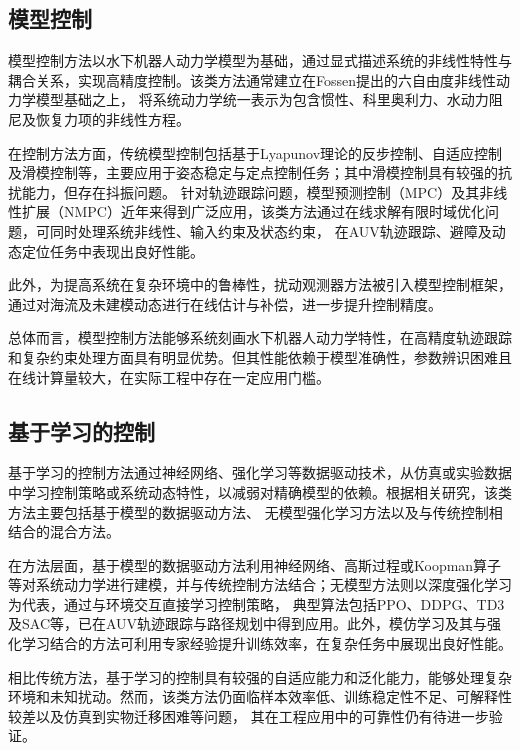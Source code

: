 \subsection{模型控制}

模型控制方法以水下机器人动力学模型为基础，通过显式描述系统的非线性特性与耦合关系，实现高精度控制。该类方法通常建立在Fossen提出的六自由度非线性动力学模型基础之上，
将系统动力学统一表示为包含惯性、科里奥利力、水动力阻尼及恢复力项的非线性方程\cite{fossen1995nonlinear}。

在控制方法方面，传统模型控制包括基于Lyapunov理论的反步控制、自适应控制及滑模控制等，主要应用于姿态稳定与定点控制任务；其中滑模控制具有较强的抗扰能力，但存在抖振问题。
针对轨迹跟踪问题，模型预测控制（MPC）及其非线性扩展（NMPC）近年来得到广泛应用，该类方法通过在线求解有限时域优化问题，可同时处理系统非线性、输入约束及状态约束，
在AUV轨迹跟踪、避障及动态定位任务中表现出良好性能\cite{heshmati2019robust,heshmati2020robust}。

此外，为提高系统在复杂环境中的鲁棒性，扰动观测器方法被引入模型控制框架，通过对海流及未建模动态进行在线估计与补偿，进一步提升控制精度\cite{hu2024disturbance}。

总体而言，模型控制方法能够系统刻画水下机器人动力学特性，在高精度轨迹跟踪和复杂约束处理方面具有明显优势。但其性能依赖于模型准确性，参数辨识困难且在线计算量较大，在实际工程中存在一定应用门槛。

\subsection{基于学习的控制}

基于学习的控制方法通过神经网络、强化学习等数据驱动技术，从仿真或实验数据中学习控制策略或系统动态特性，以减弱对精确模型的依赖。根据相关研究，该类方法主要包括基于模型的数据驱动方法、
无模型强化学习方法以及与传统控制相结合的混合方法\cite{Hong2025Review}。

在方法层面，基于模型的数据驱动方法利用神经网络、高斯过程或Koopman算子\cite{mamakoukas2021derivative}等对系统动力学进行建模，并与传统控制方法结合\cite{cui2017adaptive}；无模型方法则以深度强化学习为代表，通过与环境交互直接学习控制策略，
典型算法包括PPO、DDPG、TD3及SAC等，已在AUV轨迹跟踪与路径规划中得到应用\cite{chu2022path,hadi2022deep,wang2023path}。此外，模仿学习及其与强化学习结合的方法可利用专家经验提升训练效率，在复杂任务中展现出良好性能\cite{chu2020motion}。

相比传统方法，基于学习的控制具有较强的自适应能力和泛化能力，能够处理复杂环境和未知扰动。然而，该类方法仍面临样本效率低、训练稳定性不足、可解释性较差以及仿真到实物迁移困难等问题，
其在工程应用中的可靠性仍有待进一步验证。

